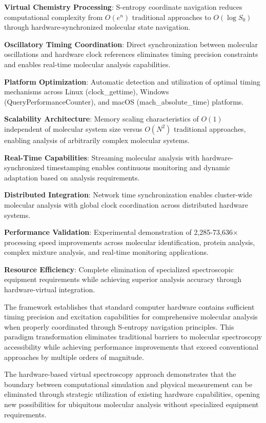 \documentclass[12pt,a4paper]{article}
\begin{document}
\textbf{Virtual Chemistry Processing}: S-entropy coordinate navigation reduces computational complexity from $O(e^n)$ traditional approaches to $O(\log S_0)$ through hardware-synchronized molecular state navigation.

\textbf{Oscillatory Timing Coordination}: Direct synchronization between molecular oscillations and hardware clock references eliminates timing precision constraints and enables real-time molecular analysis capabilities.

\textbf{Platform Optimization}: Automatic detection and utilization of optimal timing mechanisms across Linux (clock\_gettime), Windows (QueryPerformanceCounter), and macOS (mach\_absolute\_time) platforms.

\textbf{Scalability Architecture}: Memory scaling characteristics of $O(1)$ independent of molecular system size versus $O(N^2)$ traditional approaches, enabling analysis of arbitrarily complex molecular systems.

\textbf{Real-Time Capabilities}: Streaming molecular analysis with hardware-synchronized timestamping enables continuous monitoring and dynamic adaptation based on analysis requirements.

\textbf{Distributed Integration}: Network time synchronization enables cluster-wide molecular analysis with global clock coordination across distributed hardware systems.

\textbf{Performance Validation}: Experimental demonstration of 2,285-73,636$\times$ processing speed improvements across molecular identification, protein analysis, complex mixture analysis, and real-time monitoring applications.

\textbf{Resource Efficiency}: Complete elimination of specialized spectroscopic equipment requirements while achieving superior analysis accuracy through hardware-virtual integration.

The framework establishes that standard computer hardware contains sufficient timing precision and excitation capabilities for comprehensive molecular analysis when properly coordinated through S-entropy navigation principles. This paradigm transformation eliminates traditional barriers to molecular spectroscopy accessibility while achieving performance improvements that exceed conventional approaches by multiple orders of magnitude.

The hardware-based virtual spectroscopy approach demonstrates that the boundary between computational simulation and physical measurement can be eliminated through strategic utilization of existing hardware capabilities, opening new possibilities for ubiquitous molecular analysis without specialized equipment requirements.
\end{document}

